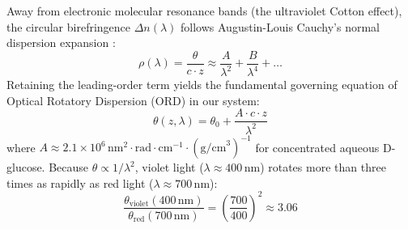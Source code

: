 \documentclass[twocolumn,10pt,a4paper]{article}
\begin{document}
Away from electronic molecular resonance bands (the ultraviolet Cotton effect), the circular birefringence $\Delta n(\lambda)$ follows Augustin-Louis Cauchy's normal dispersion expansion \cite{cauchy1836, djerassi1960}:
\begin{equation}
  \rho(\lambda) = \frac{\theta}{c \cdot z} \approx \frac{A}{\lambda^2} + \frac{B}{\lambda^4} + \dots
  \label{eq:cauchy_dispersion}
\end{equation}
Retaining the leading-order term yields the fundamental governing equation of Optical Rotatory Dispersion (ORD) in our system:
\begin{equation}
  \theta(z, \lambda) = \theta_0 + \frac{A \cdot c \cdot z}{\lambda^2}
  \label{eq:cauchy_governing}
\end{equation}
where $A \approx 2.1 \times 10^6\,\text{nm}^2\cdot\text{rad}\cdot\text{cm}^{-1}\cdot(\text{g/cm}^3)^{-1}$ for concentrated aqueous D-glucose. Because $\theta \propto 1/\lambda^2$, violet light ($\lambda \approx 400\,\text{nm}$) rotates more than three times as rapidly as red light ($\lambda \approx 700\,\text{nm}$):
\begin{equation}
  \frac{\theta_{\text{violet}}(400\,\text{nm})}{\theta_{\text{red}}(700\,\text{nm})} = \left( \frac{700}{400} \right)^2 \approx 3.06
  \label{eq:dispersion_ratio}
\end{equation}
\end{document}
